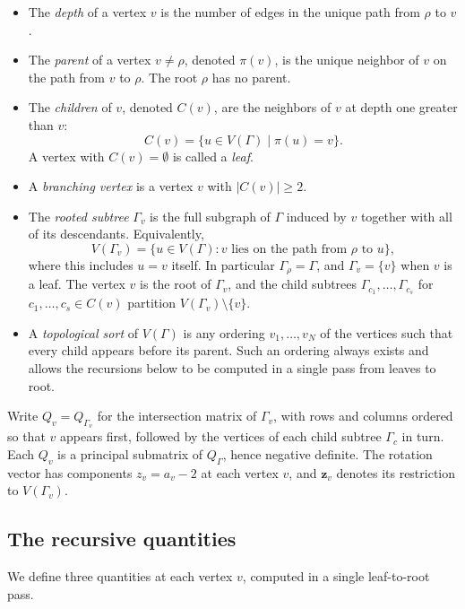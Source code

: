 \documentclass[11pt]{amsart}
\theoremstyle{plain}
\theoremstyle{definition}
\theoremstyle{remark}
\newcommand{\dfn}[1]{{\em #1}}
\begin{document}
\begin{itemize}
\item The \dfn{depth} of a vertex $v$ is the number of edges in the
      unique path from $\rho$ to $v$.
\item The \dfn{parent} of a vertex $v\ne\rho$, denoted $\pi(v)$, is
      the unique neighbor of $v$ on the path from $v$ to $\rho$. The
      root $\rho$ has no parent.
\item The \dfn{children} of $v$, denoted $C(v)$, are the neighbors of
      $v$ at depth one greater than $v$:
      \[
      C(v)=\{u\in V(\Gamma)\mid \pi(u)=v\}.
      \]
      A vertex with $C(v)=\emptyset$ is called a \dfn{leaf}.
\item A \dfn{branching vertex} is a vertex $v$ with $|C(v)|\ge 2$.
\item The \dfn{rooted subtree} $\Gamma_v$ is the full subgraph of
      $\Gamma$ induced by $v$ together with all of its descendants.
      Equivalently,
      \[
      V(\Gamma_v)=\{u\in V(\Gamma):v\text{ lies on the path from }\rho\text{ to }u\},
      \]
      where this includes $u=v$ itself. In particular
      $\Gamma_\rho=\Gamma$, and $\Gamma_v=\{v\}$ when $v$ is a leaf.
      The vertex $v$ is the root of $\Gamma_v$, and the child subtrees
      $\Gamma_{c_1},\ldots,\Gamma_{c_s}$ for $c_1,\ldots,c_s\in C(v)$
      partition $V(\Gamma_v)\setminus\{v\}$.
\item A \dfn{topological sort} of $V(\Gamma)$ is any ordering
      $v_1,\dots,v_N$ of the vertices such that every child appears
      before its parent. Such an ordering always exists and allows
      the recursions below to be computed in a single pass from
      leaves to root.
\end{itemize}

Write $Q_v=Q_{\Gamma_v}$ for the intersection matrix of $\Gamma_v$,
with rows and columns ordered so that $v$ appears first, followed by
the vertices of each child subtree $\Gamma_c$ in turn. Each $Q_v$ is
a principal submatrix of $Q_\Gamma$, hence negative definite. The
rotation vector has components $z_v=a_v-2$ at each vertex $v$, and
$\mathbf{z}_v$ denotes its restriction to $V(\Gamma_v)$.

\subsection*{The recursive quantities}

We define three quantities at each vertex $v$, computed in a single
leaf-to-root pass.
\end{document}
